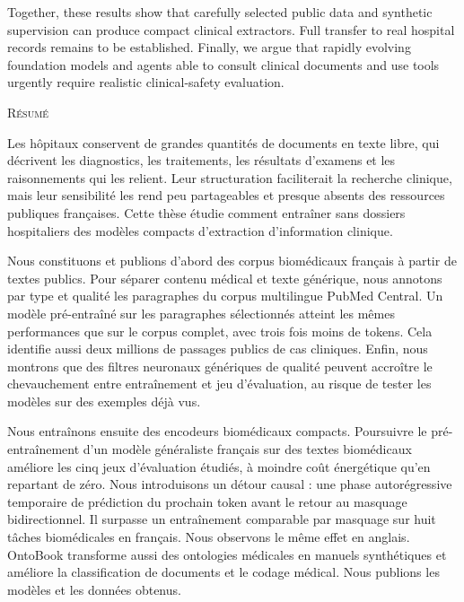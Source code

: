 Together, these results show that carefully selected public data and synthetic supervision can produce compact clinical extractors. Full transfer to real hospital records remains to be established. Finally, we argue that rapidly evolving foundation models and agents able to consult clinical documents and use tools urgently require realistic clinical-safety evaluation.

\clearpage
{}
\begin{center}
  \textsc{Résumé}
\end{center}
\noindent

Les hôpitaux conservent de grandes quantités de documents en texte libre, qui décrivent les diagnostics, les traitements, les résultats d'examens et les raisonnements qui les relient. Leur structuration faciliterait la recherche clinique, mais leur sensibilité les rend peu partageables et presque absents des ressources publiques françaises. Cette thèse étudie comment entraîner sans dossiers hospitaliers des modèles compacts d'extraction d'information clinique.

Nous constituons et publions d'abord des corpus biomédicaux français à partir de textes publics. Pour séparer contenu médical et texte générique, nous annotons par type et qualité les paragraphes du corpus multilingue PubMed Central. Un modèle pré-entraîné sur les paragraphes sélectionnés atteint les mêmes performances que sur le corpus complet, avec trois fois moins de tokens. Cela identifie aussi deux millions de passages publics de cas cliniques. Enfin, nous montrons que des filtres neuronaux génériques de qualité peuvent accroître le chevauchement entre entraînement et jeu d'évaluation, au risque de tester les modèles sur des exemples déjà vus.

Nous entraînons ensuite des encodeurs biomédicaux compacts. Poursuivre le pré-entraînement d'un modèle généraliste français sur des textes biomédicaux améliore les cinq jeux d'évaluation étudiés, à moindre coût énergétique qu'en repartant de zéro. Nous introduisons un détour causal : une phase autorégressive temporaire de prédiction du prochain token avant le retour au masquage bidirectionnel. Il surpasse un entraînement comparable par masquage sur huit tâches biomédicales en français. Nous observons le même effet en anglais. OntoBook transforme aussi des ontologies médicales en manuels synthétiques et améliore la classification de documents et le codage médical. Nous publions les modèles et les données obtenus.

